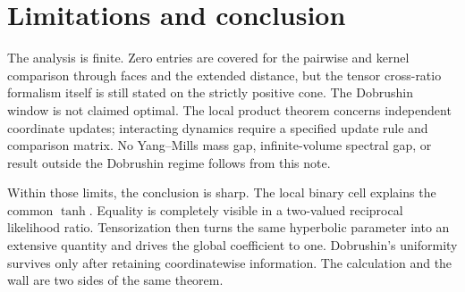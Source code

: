 \documentclass[11pt]{article}
\newcommand{\1}{\mathbf{1}}
\begin{document}
\section{Limitations and conclusion}

The analysis is finite.  Zero entries are covered for the pairwise and kernel
comparison through faces and the extended distance, but the tensor
cross-ratio formalism itself is still stated on the strictly positive cone.
The Dobrushin window is not claimed optimal.  The local product theorem
concerns independent coordinate updates;
interacting dynamics require a specified update rule and comparison matrix.
No Yang--Mills mass gap, infinite-volume spectral gap, or result outside the
Dobrushin regime follows from this note.

Within those limits, the conclusion is sharp.  The local binary cell explains
the common $\tanh$.  Equality is completely visible in a two-valued reciprocal
likelihood ratio.  Tensorization then turns the same hyperbolic parameter into
an extensive quantity and drives the global coefficient to one.  Dobrushin's
uniformity survives only after retaining coordinatewise information.  The
calculation and the wall are two sides of the same theorem.
\end{document}
